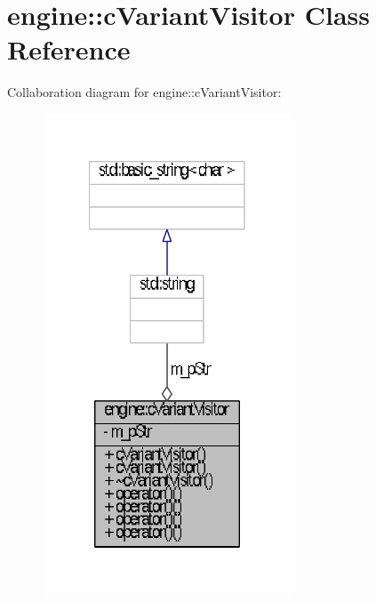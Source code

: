 \hypertarget{classengine_1_1cVariantVisitor}{\section{engine\-:\-:c\-Variant\-Visitor \-Class \-Reference}
\label{classengine_1_1cVariantVisitor}
}


\-Collaboration diagram for engine\-:\-:c\-Variant\-Visitor\-:
\nopagebreak
\begin{figure}[H]
\begin{center}
\leavevmode
\includegraphics[width=210pt]{classengine_1_1cVariantVisitor__coll__graph}
\end{center}
\end{figure}
